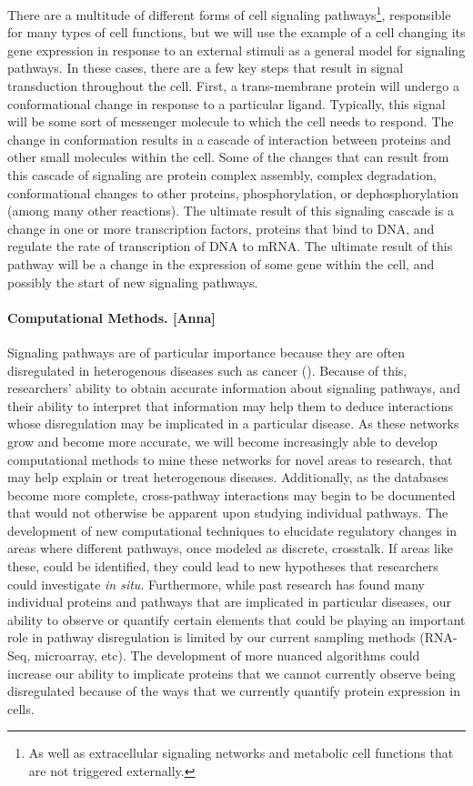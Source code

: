 \documentclass[12pt,twoside]{reedthesis}
\newcommand{\new}[2]{{\color{orange}#1 [#2]}}
\theoremstyle{definition}
\begin{document}
There are a multitude of different forms of cell signaling pathways\footnote{As well as extracellular signaling networks and metabolic cell functions that are not triggered externally.}, responsible for many types of cell functions, but we will use the example of a cell changing its gene expression in response to an external stimuli as a general model for signaling pathways. In these cases, there are a few key steps that result in signal transduction throughout the cell. First, a trans-membrane protein will undergo a conformational change in response to a particular ligand. Typically, this signal will be some sort of messenger molecule to which the cell needs to respond. The change in conformation results in a cascade of interaction between proteins and other small molecules within the cell. Some of the changes that can result from this cascade of signaling are protein complex assembly, complex degradation, conformational changes to other proteins, phosphorylation, or dephosphorylation (among many other reactions). The ultimate result of this signaling cascade is a change in one or more transcription factors, proteins that bind to DNA, and regulate the rate of transcription of DNA to mRNA. The ultimate result of this pathway will be a change in the expression of some gene within the cell, and possibly the start of new signaling pathways.\par

\paragraph{\new{Computational Methods.}{Anna}}
Signaling pathways are of particular importance because they are often disregulated in heterogenous diseases such as cancer (\cite{papers}). Because of this, researchers' ability to obtain accurate information about signaling pathways, and their ability to interpret that information may help them to deduce interactions whose disregulation may be implicated in a particular disease. As these networks grow and become more accurate, we will become increasingly able to develop computational methods to mine these networks for novel areas to research, that may help explain or treat heterogenous diseases. Additionally, as the databases become more complete, cross-pathway interactions may begin to be documented that would not otherwise be apparent upon studying individual pathways. The development of new computational techniques to elucidate regulatory changes in areas where different pathways, once modeled as discrete, crosstalk. If areas like these, could be identified, they could lead to new hypotheses that researchers could investigate \textit{in situ}. Furthermore, while past research has found many individual proteins and pathways that are implicated in particular diseases, our ability to observe or quantify certain elements that could be playing an important role in pathway disregulation is limited by our current sampling methods (RNA-Seq, microarray, etc). The development of more nuanced algorithms could increase our ability to implicate proteins that we cannot currently observe being disregulated because of the ways that we currently quantify protein expression in cells.\par
\end{document}
